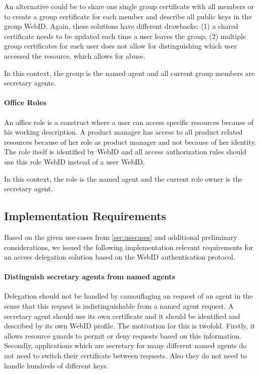 \documentclass[a4paper]{llncs}
\begin{document}
An alternative could be to share one single group certificate with all members or to create a group certificate for each member and describe all public keys in the group WebID.
Again, these solutions have different drawbacks: (1) a shared certificate needs to be updated each time a user leaves the group, (2) multiple group certificates for each user does not allow for distinguishing which user accessed the resource, which allows for abuse. 

In this context, the group is the named agent and all current group members are secretary agents.%

\paragraph{Office Roles}
An office role is a construct where a user can access specific resources because of his working description.
A product manager has access to all product related resources because of her role as product manager and not because of her identity.
The role itself is identified by WebID and all access authorization rules should use this role WebID instead of a user WebID.

In this context, the role is the named agent and the current role owner is the secretary agent.

\subsection{Implementation Requirements}\label{sec:req}

Based on the given use-cases from \autoref{sec:usecases} and additional preliminary considerations, we issued the following implementation relevant requirements for an access delegation solution based on the WebID authentication protocol.

\paragraph{Distinguish secretary agents from named agents}
Delegation should not be handled by camouflaging an request of an agent in the sense that this request is indistinguishable from a named agent request.
A secretary agent should use its own certificate and it should be identified and described by its own WebID profile.
The motivation for this is twofold.
Firstly, it allows resource guards to permit or deny requests based on this information.
Secondly, applications which are secretary for many different named agents do not need to switch their certificate between requests.
Also they do not need to handle hundreds of different keys.
\end{document}
